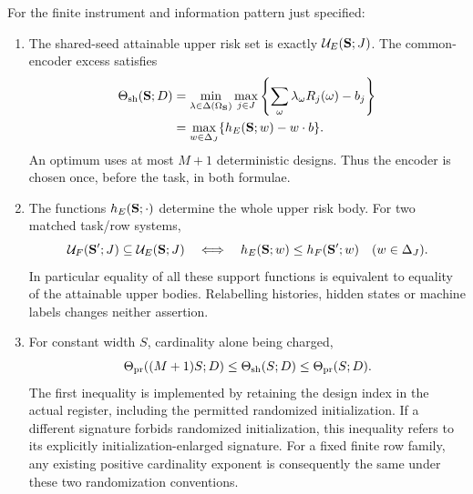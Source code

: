 \begin{theorem}
\label{thm:v9-minimax}
For the finite instrument and information pattern just specified:
\begin{enumerate}
\item The shared-seed attainable upper risk set is exactly
$\mathcal U_E({\bf S};J)$. The common-encoder excess satisfies
\begin{align}
 \Theta_{\rm sh}({\bf S};D)
 &=\min_{\lambda\in\Delta(\Omega_{\bf S})}
       \max_{j\in J}\left\{\sum_\omega\lambda_\omega
                                      R_j(\omega)-b_j\right\}
                                                        \label{eq:v9-primal}\\
 &=\max_{w\in\Delta_J}\{h_E({\bf S};w)-w\cdot b\}.
                                                        \label{eq:v9-dual}
\end{align}
An optimum uses at most $M+1$ deterministic designs. Thus the encoder is
chosen once, before the task, in both formulae.
\item The functions $h_E({\bf S};\cdot)$ determine the whole upper risk
body. For two matched task/row systems,
\[
 \mathcal U_F({\bf S}';J)\subseteq\mathcal U_E({\bf S};J)
 \quad\Longleftrightarrow\quad
 h_E({\bf S};w)\le h_F({\bf S}';w)\quad(w\in\Delta_J).
\]
In particular equality of all these support functions is equivalent to
equality of the attainable upper bodies. Relabelling histories, hidden
states or machine labels changes neither assertion.
\item For constant width $S$, cardinality alone being charged,
\begin{equation}
 \Theta_{\rm pr}((M+1)S;D)
       \le\Theta_{\rm sh}(S;D)\le\Theta_{\rm pr}(S;D).
 \label{eq:v9-seedprice}
\end{equation}
The first inequality is implemented by retaining the design index in
the actual register, including the permitted randomized initialization.
If a different signature forbids randomized initialization, this
inequality refers to its explicitly initialization-enlarged signature. For a fixed finite row
family, any existing positive cardinality exponent is consequently the
same under these two randomization conventions.
\end{enumerate}
\end{theorem}
